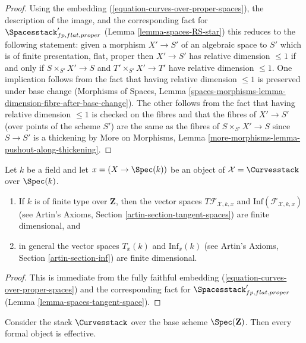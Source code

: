 \begin{proof}
Using the embedding (\ref{equation-curves-over-proper-spaces}),
the description of the image, and
the corresponding fact for $\Spacesstack'_{fp, flat, proper}$
(Lemma \ref{lemma-spaces-RS-star})
this reduces to the following statement:
given a morphism $X' \to S'$ of an algebraic space to $S'$
which is of finite presentation, flat, proper then
$X' \to S'$ has relative dimension $\leq 1$
if and only if $S \times_{S'} X' \to S$
and $T' \times_{S'} X' \to T'$ have relative dimension $\leq 1$.
One implication follows from the fact that
having relative dimension $\leq 1$ is preserved under base change
(Morphisms of Spaces, Lemma
\ref{spaces-morphisms-lemma-dimension-fibre-after-base-change}).
The other follows from the fact that having relative
dimension $\leq 1$ is checked on the fibres and that
the fibres of $X' \to S'$ (over points of the scheme $S'$)
are the same as the fibres of $S \times_{S'} X' \to S$
since $S \to S'$ is a thickening by
More on Morphisms, Lemma \ref{more-morphisms-lemma-pushout-along-thickening}.
\end{proof}

\begin{lemma}
\label{lemma-curves-tangent-space}
Let $k$ be a field and let $x = (X \to \Spec(k))$ be an object of
$\mathcal{X} = \Curvesstack$ over $\Spec(k)$.
\begin{enumerate}
\item If $k$ is of finite type over $\mathbf{Z}$, then
the vector spaces $T\mathcal{F}_{\mathcal{X}, k, x}$ and
$\text{Inf}(\mathcal{F}_{\mathcal{X}, k, x})$
(see Artin's Axioms, Section \ref{artin-section-tangent-spaces})
are finite dimensional, and
\item in general the vector spaces $T_x(k)$ and $\text{Inf}_x(k)$
(see Artin's Axioms, Section \ref{artin-section-inf})
are finite dimensional.
\end{enumerate}
\end{lemma}

\begin{proof}
This is immediate from the fully faithful embedding
(\ref{equation-curves-over-proper-spaces}) and
the corresponding fact for $\Spacesstack'_{fp, flat, proper}$
(Lemma \ref{lemma-spaces-tangent-space}).
\end{proof}

\begin{lemma}
\label{lemma-curves-existence}
Consider the stack $\Curvesstack$ over the base
scheme $\Spec(\mathbf{Z})$. Then every formal object is effective.
\end{lemma}

